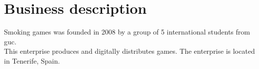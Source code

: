 \chapter{Business description}
Smoking games was founded in 2008 by a group of 5 international students from guc.\\
This enterprise produces and digitally distributes games. The enterprise is located in Tenerife, Spain.





